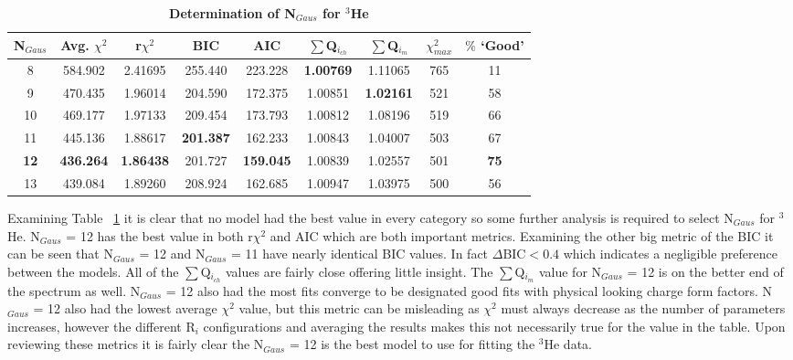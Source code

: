 \begin{table}[!h]
\centering
\begin{tabular}{|c c c c c c c c c|}
\hline
\textbf{N$_{Gaus}$} & \textbf{Avg. $\chi^2$} & \textbf{r$\chi^2$} & \textbf{BIC} & \textbf{AIC} & \textbf{$\sum$Q$_{i_{ch}}$} & \textbf{$\sum$Q$_{i_{m}}$} & \textbf{$\chi^2_{max}$} & \textbf{$\%$ `Good'} \\
\hline
8 & 584.902 & 2.41695 & 255.440 & 223.228 & \textbf{1.00769} & 1.11065 & 765 & 11 \\
9 & 470.435 & 1.96014 & 204.590 & 172.375 & 1.00851 & \textbf{1.02161} & 521 & 58 \\
10 & 469.177 & 1.97133 & 209.454 & 173.793 & 1.00812 & 1.08196 & 519 & 66 \\
11 & 445.136 & 1.88617 & \textbf{201.387} & 162.233 & 1.00843 & 1.04007 & 503 & 67 \\
\textbf{12} & \textbf{436.264} & \textbf{1.86438} & 201.727 & \textbf{159.045} & 1.00839 & 1.02557 & 501 & \textbf{75} \\
13 & 439.084 & 1.89260 & 208.924 & 162.685 & 1.00947 & 1.03975 & 500 & 56 \\
\hline
\end{tabular}
\caption{\bf{Determination of N$_{Gaus}$ for $^3$He}}
\label{tab:3he_ngaus}
\end{table}

Examining Table ~\ref{tab:3he_ngaus} it is clear that no model had the best value in every category so some further analysis is required to select N$_{Gaus}$ for $^3$He. N$_{Gaus}$ = 12 has the best value in both r$\chi^2$ and AIC which are both important metrics. Examining the other big metric of the BIC it can be seen that N$_{Gaus}$ = 12 and N$_{Gaus}$ = 11 have nearly identical BIC values. In fact $\Delta$BIC$<0.4$ which indicates a negligible preference between the models. All of the $\sum$Q$_{i_{ch}}$ values are fairly close offering little insight. The $\sum$Q$_{i_{m}}$ value for N$_{Gaus}$ = 12 is on the better end of the spectrum as well. N$_{Gaus}$ = 12 also had the most fits converge to be designated good fits with physical looking charge form factors. N$_{Gaus}$ = 12 also had the lowest average $\chi^2$ value, but this metric can be misleading as $\chi^2$ must always decrease as the number of parameters increases, however the different R$_i$ configurations and averaging the results makes this not necessarily true for the value in the table. Upon reviewing these metrics it is fairly clear the N$_{Gaus}$ = 12 is the best model to use for fitting the $^3$He data.

